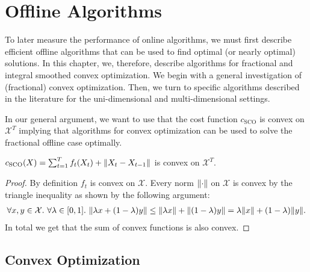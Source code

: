 
\chapter{Offline Algorithms}\label{chapter:offline_algorithms}

To later measure the performance of online algorithms, we must first describe efficient offline algorithms that can be used to find optimal (or nearly optimal) solutions. In this chapter, we, therefore, describe algorithms for fractional and integral smoothed convex optimization. We begin with a general investigation of (fractional) convex optimization. Then, we turn to specific algorithms described in the literature for the uni-dimensional and multi-dimensional settings.

In our general argument, we want to use that the cost function $c_{\text{SCO}}$ is convex on $\mathcal{X}^T$ implying that algorithms for convex optimization can be used to solve the fractional offline case optimally.

\begin{lemma}
$c_{\text{SCO}}(X) = \sum_{t=1}^T f_t(X_t) + \lVert X_t - X_{t-1}\rVert$ is convex on $\mathcal{X}^T$.
\end{lemma}
\begin{proof}
By definition $f_t$ is convex on $\mathcal{X}$. Every norm $\lVert\cdot\rVert$ on $\mathcal{X}$ is convex by the triangle inequality as shown by the following argument: \begin{align*}
    \forall x, y \in \mathcal{X}.\ \forall \lambda \in [0,1].\ \norm{\lambda x + (1 - \lambda) y} \leq \norm{\lambda x} + \norm{(1 - \lambda) y} = \lambda \norm{x} + (1 - \lambda) \norm{y}.
\end{align*} In total we get that the sum of convex functions is also convex.
\end{proof}

\section{Convex Optimization}\label{section:offline_algorithms:convex_optimization}

